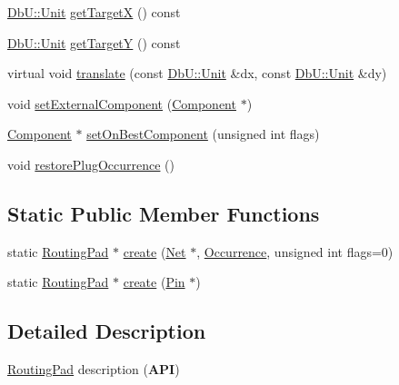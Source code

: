 \begin{DoxyCompactItemize}
\item 
\hyperlink{group__DbUGroup_ga4fbfa3e8c89347af76c9628ea06c4146}{Db\-U\-::\-Unit} \hyperlink{classHurricane_1_1RoutingPad_a3376a98a932e54c54de91a443fc38c60}{get\-Target\-X} () const 
\item 
\hyperlink{group__DbUGroup_ga4fbfa3e8c89347af76c9628ea06c4146}{Db\-U\-::\-Unit} \hyperlink{classHurricane_1_1RoutingPad_aad58421671767ccc4fac11b3a575cea8}{get\-Target\-Y} () const 
\item 
virtual void \hyperlink{classHurricane_1_1RoutingPad_a41bf66ffda0c0ceaaebc67acd72d5b36}{translate} (const \hyperlink{group__DbUGroup_ga4fbfa3e8c89347af76c9628ea06c4146}{Db\-U\-::\-Unit} \&dx, const \hyperlink{group__DbUGroup_ga4fbfa3e8c89347af76c9628ea06c4146}{Db\-U\-::\-Unit} \&dy)
\item 
void \hyperlink{classHurricane_1_1RoutingPad_a9f448ad4f05f6995edc4a5ab50501586}{set\-External\-Component} (\hyperlink{classHurricane_1_1Component}{Component} $\ast$)
\item 
\hyperlink{classHurricane_1_1Component}{Component} $\ast$ \hyperlink{classHurricane_1_1RoutingPad_a410992ef75c40f9a898c36f39a7d1a1a}{set\-On\-Best\-Component} (unsigned int flags)
\item 
void \hyperlink{classHurricane_1_1RoutingPad_a1fcb0951f5f9505c6978bf498f78fce9}{restore\-Plug\-Occurrence} ()
\end{DoxyCompactItemize}
\subsection*{Static Public Member Functions}
\begin{DoxyCompactItemize}
\item 
static \hyperlink{classHurricane_1_1RoutingPad}{Routing\-Pad} $\ast$ \hyperlink{classHurricane_1_1RoutingPad_a87c3a286477f81b9c791dc24104a3e51}{create} (\hyperlink{classHurricane_1_1Net}{Net} $\ast$, \hyperlink{classHurricane_1_1Occurrence}{Occurrence}, unsigned int flags=0)
\item 
static \hyperlink{classHurricane_1_1RoutingPad}{Routing\-Pad} $\ast$ \hyperlink{classHurricane_1_1RoutingPad_a1883e5711b5700cd7d1024f1cff6abb0}{create} (\hyperlink{classHurricane_1_1Pin}{Pin} $\ast$)
\end{DoxyCompactItemize}


\subsection{Detailed Description}
\hyperlink{classHurricane_1_1RoutingPad}{Routing\-Pad} description ({\bfseries A\-P\-I}) 

